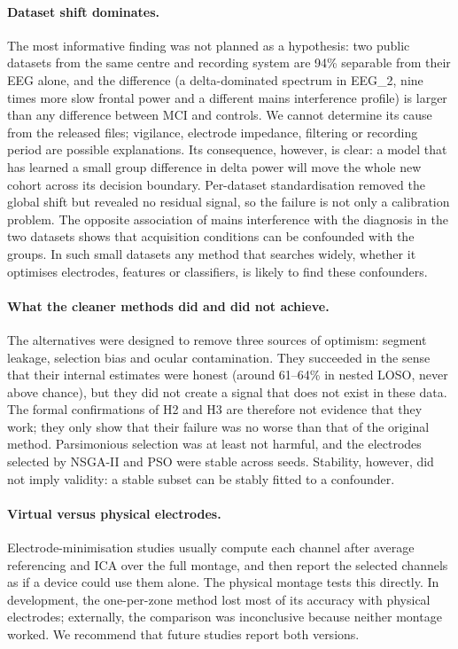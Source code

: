 \paragraph{Dataset shift dominates.} The most informative finding was not planned as a hypothesis: two public datasets from the same centre and recording system are 94\% separable from their EEG alone, and the difference (a delta-dominated spectrum in EEG\_2, nine times more slow frontal power and a different mains interference profile) is larger than any difference between MCI and controls. We cannot determine its cause from the released files; vigilance, electrode impedance, filtering or recording period are possible explanations. Its consequence, however, is clear: a model that has learned a small group difference in delta power will move the whole new cohort across its decision boundary. Per-dataset standardisation removed the global shift but revealed no residual signal, so the failure is not only a calibration problem. The opposite association of mains interference with the diagnosis in the two datasets shows that acquisition conditions can be confounded with the groups. In such small datasets any method that searches widely, whether it optimises electrodes, features or classifiers, is likely to find these confounders.

\paragraph{What the cleaner methods did and did not achieve.} The alternatives were designed to remove three sources of optimism: segment leakage, selection bias and ocular contamination. They succeeded in the sense that their internal estimates were honest (around 61--64\% in nested LOSO, never above chance), but they did not create a signal that does not exist in these data. The formal confirmations of H2 and H3 are therefore not evidence that they work; they only show that their failure was no worse than that of the original method. Parsimonious selection was at least not harmful, and the electrodes selected by NSGA-II and PSO were stable across seeds. Stability, however, did not imply validity: a stable subset can be stably fitted to a confounder.

\paragraph{Virtual versus physical electrodes.} Electrode-minimisation studies usually compute each channel after average referencing and ICA over the full montage, and then report the selected channels as if a device could use them alone. The physical montage tests this directly. In development, the one-per-zone method lost most of its accuracy with physical electrodes; externally, the comparison was inconclusive because neither montage worked. We recommend that future studies report both versions.

